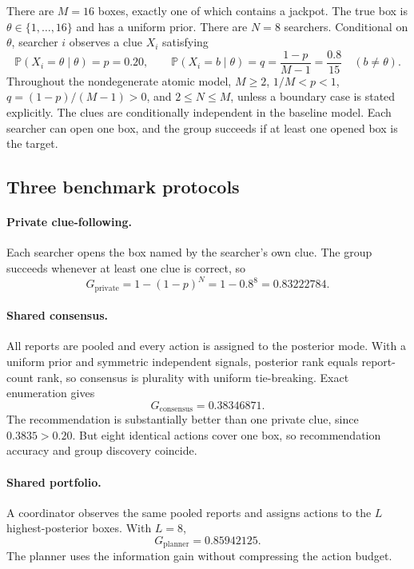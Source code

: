 \documentclass[11pt]{article}
\theoremstyle{definition}
\theoremstyle{remark}
\newcommand{\Prob}{\mathbb{P}}
\newcommand{\1}{\mathbf{1}}
\newcommand{\priv}{\mathrm{private}}
\newcommand{\cons}{\mathrm{consensus}}
\newcommand{\plan}{\mathrm{planner}}
\begin{document}
There are $M=16$ boxes, exactly one of which contains a jackpot. The true box is $\theta\in\{1,\ldots,16\}$ and has a uniform prior. There are $N=8$ searchers. Conditional on $\theta$, searcher $i$ observes a clue $X_i$ satisfying
\[
\Prob(X_i=\theta\mid\theta)=p=0.20,
\qquad
\Prob(X_i=b\mid\theta)=q=\frac{1-p}{M-1}=\frac{0.8}{15}
\quad(b\neq\theta).
\]
Throughout the nondegenerate atomic model, $M\ge2$, $1/M<p<1$, $q=(1-p)/(M-1)>0$, and $2\le N\le M$, unless a boundary case is stated explicitly. The clues are conditionally independent in the baseline model. Each searcher can open one box, and the group succeeds if at least one opened box is the target.

\subsection{Three benchmark protocols}

\paragraph{Private clue-following.}
Each searcher opens the box named by the searcher's own clue. The group succeeds whenever at least one clue is correct, so
\begin{equation}
G_{\priv}=1-(1-p)^N=1-0.8^8=0.83222784.
\label{eq:private}
\end{equation}

\paragraph{Shared consensus.}
All reports are pooled and every action is assigned to the posterior mode. With a uniform prior and symmetric independent signals, posterior rank equals report-count rank, so consensus is plurality with uniform tie-breaking. Exact enumeration gives
\begin{equation}
G_{\cons}=0.38346871.
\label{eq:consensus}
\end{equation}
The recommendation is substantially better than one private clue, since $0.3835>0.20$. But eight identical actions cover one box, so recommendation accuracy and group discovery coincide.

\paragraph{Shared portfolio.}
A coordinator observes the same pooled reports and assigns actions to the $L$ highest-posterior boxes. With $L=8$,
\begin{equation}
G_{\plan}=0.85942125.
\label{eq:planner}
\end{equation}
The planner uses the information gain without compressing the action budget.
\end{document}
